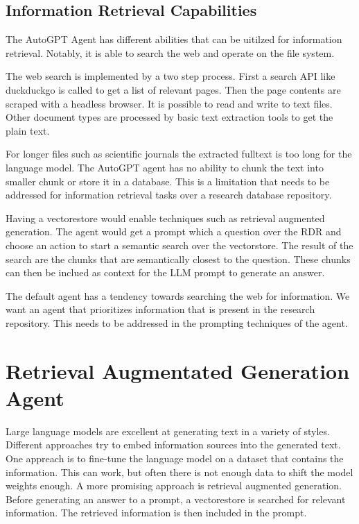 \documentclass[english, version-2022-01]{uzl-thesis}
\begin{document}
\section{Information Retrieval Capabilities}

The AutoGPT Agent has different abilities that can be uitilzed for information retrieval. Notably, it is able to search the web and operate on the file system.

The web search is implemented by a two step process. First a search API like duckduckgo is called to get a list of relevant pages. Then the page contents are scraped with a headless browser. It is possible to read and write to text files. Other document types are processed by basic text extraction tools to get the plain text.

For longer files such as scientific journals the extracted fulltext is too long for the language model. The AutoGPT agent has no ability to chunk the text into smaller chunk or store it in a database. This is a limitation that needs to be addressed for information retrieval tasks over a research database repository.

Having a vectorestore would enable techniques such as retrieval augmented generation. The agent would get a prompt which a question over the RDR and choose an action to start a semantic search over the vectorstore. The result of the search are the chunks that are semantically closest to the question. These chunks can then be inclued as context for the LLM prompt to generate an answer.

The default agent has a tendency towards searching the web for information. We want an agent that prioritizes information that is present in the research repository. This needs to be addressed in the prompting techniques of the agent.

\chapter{Retrieval Augmentated Generation Agent}

Large language models are excellent at generating text in a variety of styles. Different approaches try to embed information sources into the generated text. One appreach is to fine-tune the language model on a dataset that contains the information. This can work, but often there is not enough data to shift the model weights enough. A more promising approach is retrieval augmented generation. Before generating an answer to a prompt, a vectorestore is searched for relevant information. The retrieved information is then included in the prompt.
\end{document}
